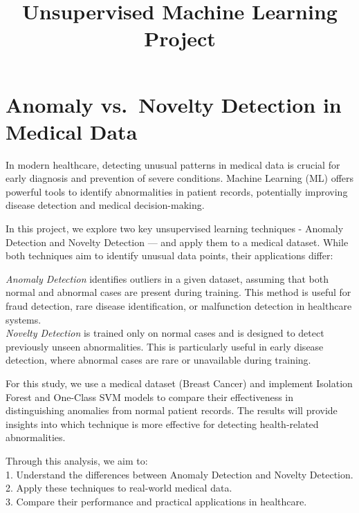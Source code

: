 \documentclass[11pt]{article}
\title{Unsupervised Machine Learning Project}
\begin{document}
    
    \maketitle
    
    

    
    \section*{\texorpdfstring{\textbf{Anomaly vs.~Novelty Detection in
Medical
Data}}{Anomaly vs.~Novelty Detection in Medical Data}}\label{anomaly-vs.-novelty-detection-in-medical-data}

In modern healthcare, detecting unusual patterns in medical data is
crucial for early diagnosis and prevention of severe conditions. Machine
Learning (ML) offers powerful tools to identify abnormalities in patient
records, potentially improving disease detection and medical
decision-making.

In this project, we explore two key unsupervised learning techniques -
Anomaly Detection and Novelty Detection --- and apply them to a medical
dataset. While both techniques aim to identify unusual data points,
their applications differ:

\emph{Anomaly Detection} identifies outliers in a given dataset,
assuming that both normal and abnormal cases are present during
training. This method is useful for fraud detection, rare disease
identification, or malfunction detection in healthcare systems. \\
\emph{Novelty Detection} is trained only on normal cases and is designed
to detect previously unseen abnormalities. This is particularly useful
in early disease detection, where abnormal cases are rare or unavailable
during training.

For this study, we use a medical dataset (Breast Cancer) and implement
Isolation Forest and One-Class SVM models to compare their effectiveness
in distinguishing anomalies from normal patient records. The results
will provide insights into which technique is more effective for
detecting health-related abnormalities.

Through this analysis, we aim to: \\
1. Understand the differences between
Anomaly Detection and Novelty Detection.\\
2. Apply these techniques to
real-world medical data. \\
3. Compare their performance and practical
applications in healthcare.\\
\end{document}
